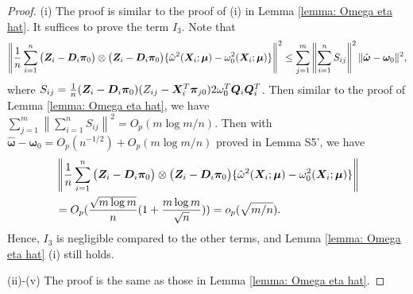\documentclass[12pt]{article}
\begin{document}
{{\begin{proof}
	(i) The proof is similar to the proof of (i) in Lemma \ref{lemma: Omega eta hat}. It suffices to prove the term $I_3$.
Note that 
\begin{align*}
		\left\|	\frac1n \sum_{i=1}^n  \big( \bm{Z}_i-\bm D_i \bm\pi_0 \big) \otimes\big( \bm{Z}_i-\bm D_i \bm\pi_0 \big)  \{\hat\omega^2(\bm{X}_i; \bm \mu )   - \omega_0^2(\bm{X}_i; \bm \mu ) \} \right\|^2 \leq  \sum_{j=1}^{m} \left\| \sum_{i=1}^{n}  S_{ij} \right\|^2 \| \hat{\bm \omega}- \bm\omega_0\|^2 ,
\end{align*}
where $S_{ij}= \frac1n (\bm{Z}_i - \bm D_i {\bm\pi}_0)   (Z_{ij} - \bm X_i^T  {\bm\pi}_{j0}) 2\omega_0^T \bm Q_i \bm Q_i^T  $. Then similar to the proof of Lemma \ref{lemma: Omega eta hat}, we have $ \sum_{j=1}^{m} \left\| \sum_{i=1}^{n}  S_{ij} \right\|^2= O_p (m\log m/n) $. Then with $\hat{\bm \omega}- \bm\omega_0= O_p(n^{-1/2}) + O_p( m\log m/n) $ proved in Lemma S5', we have 
\begin{align*}
 &	\left\|	\frac1n \sum_{i=1}^n  \big( \bm{Z}_i-\bm D_i \bm\pi_0 \big) \otimes\big( \bm{Z}_i-\bm D_i \bm\pi_0 \big)  \{\hat\omega^2(\bm{X}_i; \bm \mu )   - \omega_0^2(\bm{X}_i; \bm \mu ) \} \right\|  \\
	& =  O_p ( \frac{ \sqrt{m\log m} }{n }  ( 1+  \frac{m \log m  }{\sqrt{n}})) =  o_p(\sqrt{m/n}).  
\end{align*}
Hence, $I_3$ is negligible compared to the other terms, and Lemma \ref{lemma: Omega eta hat} (i) still holds. 

(ii)-(v) The proof is the same as those in Lemma \ref{lemma: Omega eta hat}. 


\end{proof}

}


}
\end{document}
